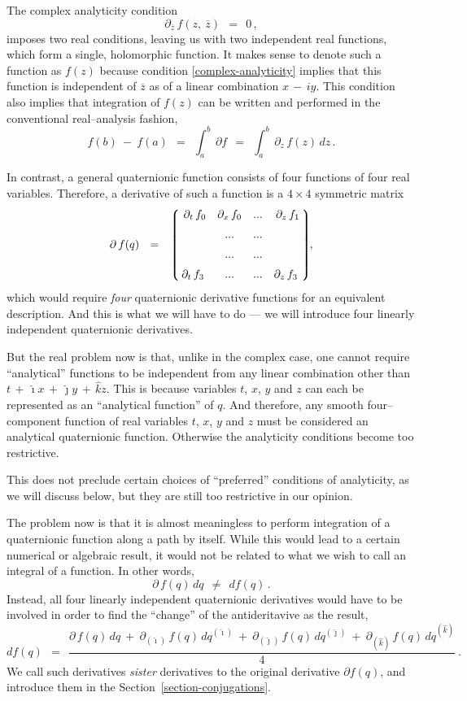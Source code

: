 \documentclass[epsfig,12pt]{article}
\def\beq{\begin{equation}}
\def\eeq{\end{equation}}
\newcommand{\p}{\partial}
\newcommand{\ov}{\overline}
\newcommand{\lgr}{\left\lgroup}
\newcommand{\rgr}{\right\rgroup}
\newcommand{\ii}{\hat\imath}
\newcommand{\jj}{\hat\jmath}
\newcommand{\kk}{\hat k}
\begin{document}
	The complex analyticity condition
\beq
\label{complex-analyticity}
	\partial_{\ov z}\, f(z,~ \ov z)	~~=~~	 0\,,
\eeq
	imposes two real conditions, leaving us with two independent real functions, which form a single, holomorphic function.
	It makes sense to denote such a function as $ f(z) $ because condition \eqref{complex-analyticity} implies that
	this function is independent of $ \ov z $ as of a linear combination $ x \,-\, i y $.
	This condition also implies that integration of $ f(z) $ can be written and performed in the conventional real--analysis fashion,
\[
	f(b)  ~-~  f(a)		~~=~~	\int_a^b\, \p f			~~=~~
		\int_a^b\, \p_z\,f(z)\, dz\,.
\]

	In contrast, a general quaternionic function consists of four functions of four real variables.
	Therefore, a derivative of such a function is a $ 4 \times 4 $ symmetric matrix
\[
	\p\, f(q)	~~=~~
		\lgr \begin{matrix}\,\,
			\p_t\, f_0	&	\p_x\, f_0	&	...	&	\p_z\,f_1	\\[2mm]
					&	...		&	...	&			\\[2mm]
					&	...		&	...	&			\\[2mm]
			\p_t\,f_3	&	...		&	...	&	\p_z\,f_3
		\,\,\end{matrix} \rgr\!\!,
\]
	which would require \emph{four} quaternionic derivative functions for an equivalent description.
	And this is what we will have to do --- we will introduce four linearly independent quaternionic derivatives.

	But the real problem now is that, unlike in the complex case, one cannot require ``analytical'' functions 
	to be independent from any linear combination other than 
	$ t \,+\, \ii x \,+\, \jj y \,+\, \kk z $.
	This is because variables $ t $, $ x $, $ y $ and $ z $ can each be represented as an ``analytical function'' of $ q $.
	And therefore, any smooth four--component function of real variables $ t $, $ x $, $ y $ and $ z $ must be considered
	an analytical quaternionic function.
	Otherwise the analyticity conditions become too restrictive.

	This does not preclude certain choices of ``preferred'' conditions of analyticity, as we will discuss below,
	but they are still too restrictive in our opinion.

	The problem now is that it is almost meaningless to perform integration of a quaternionic function along a path by itself.
	While this would lead to a certain numerical or algebraic result, it would not be related to what we wish to call an integral of a function.
	In other words,
\[
	\p\,f(q)\,dq	~~\neq~~	df(q)\,.
\]
	Instead, all four linearly independent quaternionic derivatives would have to be involved in order to find the ``change'' of the antideritavive
	as the result,
\[
	df(q)		~~=~~
		\frac{  \p\,f(q)\,dq	~+~	\p_{(\ii)}\,f(q)\,dq^{(\ii)}	~+~	\p_{(\jj)}\,f(q)\,dq^{(\jj)}	~+~	\p_{(\kk)}\,f(q)\,dq^{(\kk)} }
			{  4  }~.
\]
	We call such derivatives \emph{sister} derivatives to the original derivative $ \p f(q) $, and introduce them in the Section~\ref{section-conjugations}.
\end{document}
